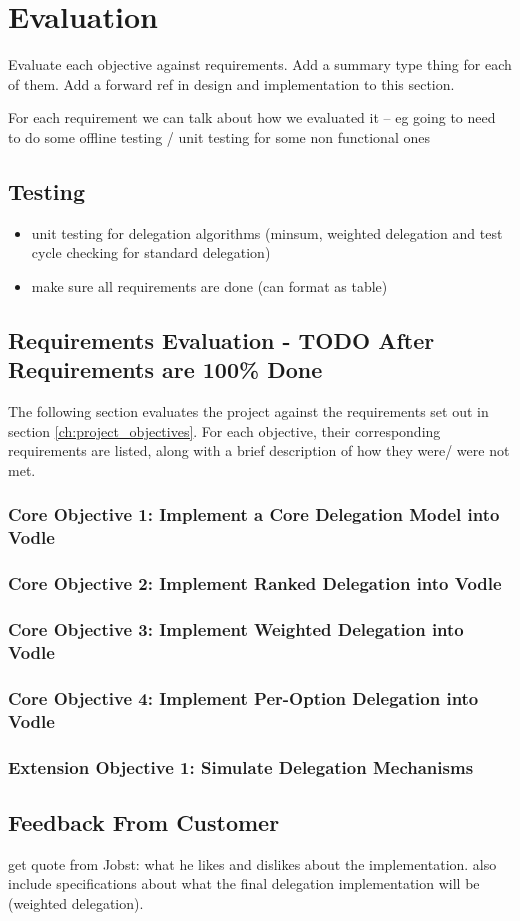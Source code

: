 \chapter{Evaluation}\label{ch:evaluation}


Evaluate each objective against requirements. Add a summary type thing for each of them.
Add a forward ref in design and implementation to this section.

For each requirement we can talk about how we evaluated it -- eg going to need to do some offline testing / unit testing for some non functional ones


\section{Testing}
\begin{itemize}
    \item unit testing for delegation algorithms (minsum, weighted delegation and test cycle checking for standard delegation)
    \item make sure all requirements are done (can format as table)
\end{itemize}
\section{Requirements Evaluation - TODO After Requirements are 100\% Done}
The following section evaluates the project against the requirements set out in section \ref{ch:project_objectives}. For each objective, their corresponding requirements are listed, along with a brief description of how they were/ were not met.

\subsection{Core Objective 1: Implement a Core Delegation Model into Vodle}
\subsection{Core Objective 2: Implement Ranked Delegation into Vodle}
\subsection{Core Objective 3: Implement Weighted Delegation into Vodle}
\subsection{Core Objective 4: Implement Per-Option Delegation into Vodle}
\subsection{Extension Objective 1: Simulate Delegation Mechanisms}

\section{Feedback From Customer}
get quote from Jobst: what he likes and dislikes about the implementation. also include specifications about what the final delegation implementation will be (weighted delegation).